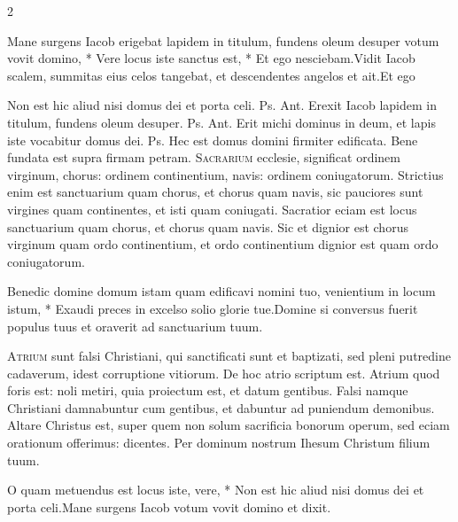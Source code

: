 \begin{multicols*}{2}
\begin{responsory-final}
{Mane surgens Iacob erigebat lapidem in titulum, fundens oleum desuper votum vovit domino, * Vere locus iste sanctus est, * Et ego nesciebam.}{Vidit Iacob scalem, summitas eius celos tangebat, et descendentes angelos et ait.}{Et ego}
\end{responsory-final}%
 Non est hic aliud nisi domus dei et porta celi. {\color{Red} Ps.}  {\color{Red} Ant.} Erexit Iacob lapidem in titulum, fundens oleum desuper. {\color{Red} Ps.}  {\color{Red} Ant.} Erit michi dominus in deum, et lapis iste vocabitur domus dei. {\color{Red} Ps.}  \V Hec est domus domini firmiter edificata. \R Bene fundata est supra firmam petram.
\lettrine[lines=2]{\zallmancaps \color{Red} S}{acrarium} ecclesie, significat ordinem virginum, chorus: ordinem continentium, navis: ordinem coniugatorum. Strictius enim est sanctuarium quam chorus, et chorus quam navis, sic pauciores sunt virgines quam continentes, et isti quam coniugati. Sacratior eciam est locus sanctuarium quam chorus, et chorus quam navis. Sic et dignior est chorus virginum quam ordo continentium, et ordo continentium dignior est quam ordo coniugatorum.
\begin{responsory}
{Benedic domine domum istam quam edificavi nomini tuo, venientium in locum istum, * Exaudi preces in excelso solio glorie tue.}{Domine si conversus fuerit populus tuus et oraverit ad sanctuarium tuum.}
\end{responsory}%
\lettrine[lines=2]{\zallmancaps \color{Blue} A}{trium} sunt falsi Christiani, qui sanctificati sunt et baptizati, sed pleni putredine cadaverum, idest corruptione vitiorum. De hoc atrio scriptum est. Atrium quod foris est: noli metiri, quia proiectum est, et datum gentibus. Falsi namque Christiani damnabuntur cum gentibus, et dabuntur ad puniendum demonibus. Altare Christus est, super quem non solum sacrificia bonorum operum, sed eciam orationum offerimus: dicentes. Per dominum nostrum Ihesum Christum filium tuum.
\begin{responsory}
{O quam metuendus est locus iste, vere, * Non est hic aliud nisi domus dei et porta celi.}{Mane surgens Iacob votum vovit domino et dixit.}
\end{responsory}%

\end{multicols*}
